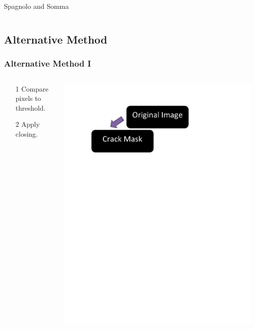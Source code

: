 \documentclass{beamer}
\begin{document}
\begin{frame}
\begin{columns}
\begin{column}{0.5\textwidth}
\begin{center}
{\tiny Spagnolo and Somma}
\end{center}
\end{column}
\end{columns}
\end{frame}

\subsection[Alternative Method]{Alternative Method}

\begin{frame}
\frametitle{Alternative Method I}
\begin{columns}
\begin{column}{0.5\textwidth}
\begin{enumerate}
\item[1] Compare pixels to threshold.
\item[2] Apply closing.
\end{enumerate}
\end{column}
\begin{column}{0.5\textwidth}
\includegraphics[width=1\textwidth,trim={1in 7.5in 2.5in 0in},clip]{alternative_method_diagram_1}
\end{column}
\end{columns}
\end{frame}
\end{document}
